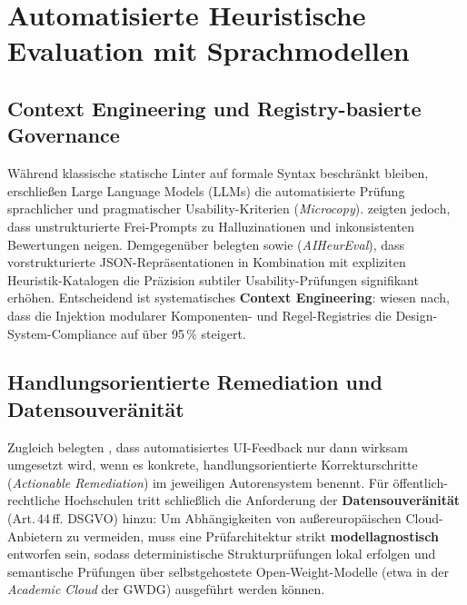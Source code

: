 \section{Automatisierte Heuristische Evaluation mit Sprachmodellen}
\label{sec:llm_evaluation}

\subsection{Context Engineering und Registry-basierte Governance}
\label{subsec:context_engineering}

Während klassische statische Linter auf formale Syntax beschränkt bleiben, erschließen Large Language Models (LLMs) die automatisierte Prüfung sprachlicher und pragmatischer Usability-Kriterien (\textit{Microcopy}). \textcite{guerino2025gpt4o} zeigten jedoch, dass unstrukturierte Frei-Prompts zu Halluzinationen und inkonsistenten Bewertungen neigen. Demgegenüber belegten \textcite{zhong2025synthetic} sowie \textcite{wang2025aiheureval} (\textit{AIHeurEval}), dass vorstrukturierte JSON-Repräsentationen in Kombination mit expliziten Heuristik-Katalogen die Präzision subtiler Usability-Prüfungen signifikant erhöhen. Entscheidend ist systematisches \textbf{Context Engineering}: \textcite{cha2026design} wiesen nach, dass die Injektion modularer Komponenten- und Regel-Registries die Design-System-Compliance auf über 95\,\% steigert.

\subsection{Handlungsorientierte Remediation und Datensouveränität}
\label{subsec:modell_agnostik_theorie}

Zugleich belegten \textcite{duan2024generating}, dass automatisiertes UI-Feedback nur dann wirksam umgesetzt wird, wenn es konkrete, handlungsorientierte Korrekturschritte (\textit{Actionable Remediation}) im jeweiligen Autorensystem benennt. Für öffentlich-rechtliche Hochschulen tritt schließlich die Anforderung der \textbf{Datensouveränität} (Art.\,44\,ff. DSGVO) hinzu: Um Abhängigkeiten von außereuropäischen Cloud-Anbietern zu vermeiden, muss eine Prüfarchitektur strikt \textbf{modellagnostisch} entworfen sein, sodass deterministische Strukturprüfungen lokal erfolgen und semantische Prüfungen über selbstgehostete Open-Weight-Modelle (etwa in der \textit{Academic Cloud} der GWDG) ausgeführt werden können.
